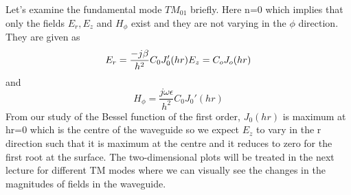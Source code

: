 Let's examine the fundamental mode $TM_{01}$ briefly. Here n=0 which implies that only the fields $E_r, E_z$ and $H_\phi$ exist and they are not varying in the $\phi$ direction. They are given as
$$
E_r=\frac{-j\beta}{h^2}C_0J_0'(hr)\\
E_z=C_oJ_o(hr)
$$
and
$$
H_\phi=\frac{j\omega\epsilon}{h^2}C_0J_0'(hr)
$$
From our study of the Bessel function of the first order, $J_0(hr)$ is maximum at hr=0 which is the centre of the waveguide so we expect $E_z$ to vary in the r direction such that it is maximum at the centre and it reduces to zero for the first root at the surface. The two-dimensional plots will be treated in the next lecture for different TM modes where we can visually see the changes in the magnitudes of fields in the waveguide.
